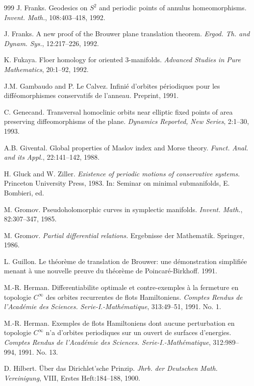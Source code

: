 \begin{thebibliography}{999}
 J. Franks. Geodesics on $S^2$ and periodic points of
annulus homeomorphisms. \emph{Invent. Math.}, 108:403--418, 1992.

 J. Franks. A new proof of the Brouwer plane translation
theorem. \emph{Ergod. Th. and Dynam. Sys.}, 12:217--226, 1992.

 K. Fukaya. Floer homology for oriented 3-manifolds.
\emph{Advanced Studies in Pure Mathematics}, 20:1--92, 1992.

 J.M. Gambaudo and P. Le Calvez. Infinié d'orbites
périodiques pour les difféomorphismes conservatifs de l'anneau.
Preprint, 1991.

 C. Genecand. Transversal homoclinic orbits near elliptic
fixed points of area preserving diffeomorphisms of the plane.
\emph{Dynamics Reported, New Series}, 2:1--30, 1993.

 A.B. Givental. Global properties of Maslov index and Morse
theory. \emph{Funct. Anal. and its Appl.}, 22:141--142, 1988.

 H. Gluck and W. Ziller. \emph{Existence of periodic motions
of conservative systems.} Princeton University Press, 1983. In: Seminar
on minimal submanifolds, E. Bombieri, ed.

 M. Gromov. Pseudoholomorphic curves in symplectic manifolds.
\emph{Invent. Math.}, 82:307--347, 1985.

 M. Gromov. \emph{Partial differential relations.}
Ergebnisse der Mathematik. Springer, 1986.

 L. Guillon. Le théorème de translation de Brouwer: une
démonstration simplifiée menant
à une nouvelle preuve du théorème de Poincaré-Birkhoff. 1991.

 M.-R. Herman. Differentiabilite optimale et contre-exemples
à la fermeture en topologie $C^\infty$ des orbites
recurrentes de flots Hamiltoniens. \emph{Comptes Rendus de l'Académie des
Sciences. Serie-I.-Mathématique}, 313:49--51, 1991. No. 1.

 M.-R. Herman. Exemples de flots Hamiltoniens dont aucune
perturbation en topologie $C^\infty$ n'a d'orbites periodiques sur un
ouvert de surfaces d'energies. \emph{Comptes Rendus de l'Académie des
Sciences. Serie-I.-Mathématique}, 312:989--994, 1991. No. 13.

 D. Hilbert. Über das Dirichlet'sche Prinzip.
\emph{Jhrb. der Deutschen Math. Vereinigung}, VIII, Erstes Heft:184--188,
1900.


\end{thebibliography}
